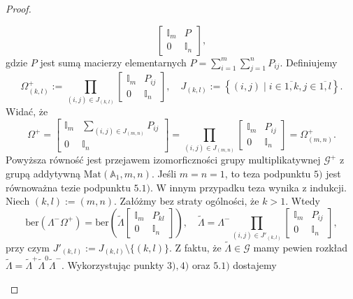 \documentclass[11pt,a4paper]{report}
\theoremstyle{definition}
\newcommand{\ber}{\mathrm{ber}}
\newcommand{\I}{\mathbb{I}}
\begin{document}
\begin{proof}
\begin{enumerate}[1)]
\begin{enumerate}[5.1)]
$$\begin{bmatrix}
     \I_m & P \\
     0 & \I_n 
     \end{bmatrix}\!,$$
gdzie $P$ jest sumą macierzy elementarnych $P = \sum_{i=1}^m \sum_{j=1}^n P_{ij}$. Definiujemy
\begin{equation}
\label{eq:prod_ber_pm}
 \Omega^+_{(k,l)} := \!\!\!\!\!\!\prod_{(i,j) \in J_{(k,l)}} \!\!\begin{bmatrix}
     \I_m & P_{ij} \\
     0 & \I_n 
     \end{bmatrix}\!\!, \quad J_{(k,l)} := \left\{ (i,j) \mid i \in \overline{1,k}, j \in \overline{1,l} \right\}\!.
\end{equation}
Widać, że 
\begin{equation*}
\Omega^+ = \begin{bmatrix}
     \I_m & \sum_{(i,j) \in J_{(m,n)}}P_{ij} \\
     0 & \I_n 
     \end{bmatrix} = \!\!\!\!\!\!\prod_{(i,j) \in J_{(m,n)}} \!\! \begin{bmatrix}
     \I_m & P_{ij} \\
     0 & \I_n 
     \end{bmatrix} = \Omega^+_{(m,n)}.
\end{equation*}
 Powyższa równość jest przejawem izomorficzności grupy multiplikatywnej $\mathcal{G^+}$ z grupą addytywną $\mathrm{Mat}(\mathbb{A}_1,m,n)$. Jeśli $m=n=1$, to teza podpunktu $5)$ jest równoważna tezie podpunktu $5.1)$. W innym przypadku teza wynika z indukcji. Niech $(k,l):=(m,n)$. Załóżmy bez straty ogólności, że $k>1$. Wtedy
\begin{equation*}
 \ber(\Lambda^-\Omega^+)= \ber \left(\tilde{\Lambda} \begin{bmatrix}
     \I_m & P_{kl} \\
     0 & \I_n 
     \end{bmatrix} \right),\quad \tilde{\Lambda} = \Lambda^- \!\!\!\!\!\!\prod_{(i,j) \in J'_{(k,l)}} \!\!\begin{bmatrix}
     \I_m & P_{ij} \\
     0 & \I_n 
     \end{bmatrix}\!\!,
\end{equation*}
przy czym $J'_{(k,l)} := J_{(k,l)} \setminus \{(k,l) \}$. Z faktu, że $\tilde{\Lambda} \in \mathcal{G}$ mamy pewien rozkład $\tilde{\Lambda} = \tilde{\Lambda}^+ \tilde{\Lambda}^0 \tilde{\Lambda}^-$. Wykorzystując punkty $3), 4)$ oraz $5.1)$ dostajemy
\begin{equation*}

\end{equation*}
\end{enumerate}
\end{enumerate}
\end{proof}
\end{document}
